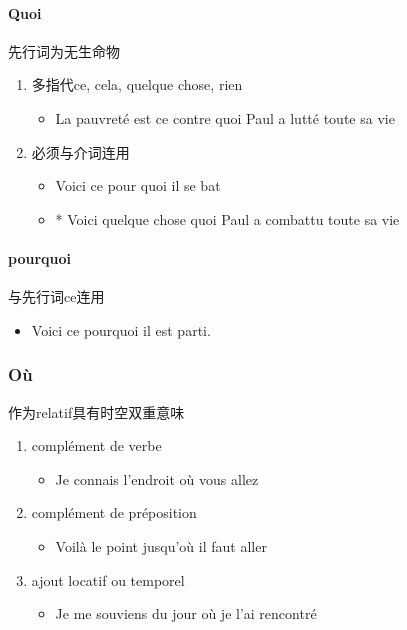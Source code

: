 \documentclass[UTF8]{report}
\begin{document}
\paragraph{Quoi}
先行词为无生命物
\begin{enumerate}
    \item 多指代ce, cela, quelque chose, rien
    \begin{itemize}
        \item La pauvreté est ce contre quoi Paul a lutté toute sa vie
    \end{itemize}
    \item 必须与介词连用
    \begin{itemize}
        \item Voici ce pour quoi il se bat
        \item * Voici quelque chose quoi Paul a combattu toute sa vie
    \end{itemize}
\end{enumerate}
\paragraph{pourquoi}
与先行词ce连用
\begin{itemize}
    \item Voici ce pourquoi il est parti.
\end{itemize}


\subsubsection{Où}
作为relatif具有时空双重意味
\begin{enumerate}
    \item complément de verbe
    \begin{itemize}
        \item Je connais l’endroit où vous allez
    \end{itemize}
    \item complément de préposition
    \begin{itemize}
        \item Voilà le point jusqu’où il faut aller
    \end{itemize}
    \item ajout locatif ou temporel
    \begin{itemize}
        \item Je me souviens du jour où je l’ai rencontré
    \end{itemize}
\end{enumerate}
\end{document}
